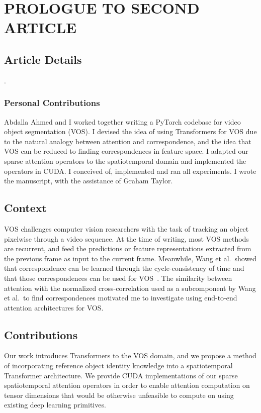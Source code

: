 \chapter{PROLOGUE TO SECOND ARTICLE}


\section{Article Details}

.

\subsection{Personal Contributions}

Abdalla Ahmed and I worked together writing a PyTorch codebase for video object
segmentation (VOS).
I devised the idea of using Transformers for VOS due to the natural analogy
between attention and correspondence, and the idea that VOS can be reduced to
finding correspondences in feature space.
I adapted our sparse attention operators to the spatiotemporal domain and
implemented the operators in CUDA.
I conceived of, implemented and ran all experiments.
I wrote the manuscript, with the assistance of Graham Taylor.


\section{Context}

VOS challenges computer vision researchers with the task of tracking an object
pixelwise through a video sequence.
At the time of writing, most VOS methods are recurrent, and feed the
predictions or feature representations extracted from the previous frame as
input to the current frame.
Meanwhile, Wang et al.\ showed that correspondence can be learned through the
cycle-consistency of time and that those correspondences can be used for
VOS~\citep{wang2019learning}.
The similarity between attention with the normalized cross-correlation used as
a subcomponent by Wang et al.\ to find correspondences motivated me to
investigate using end-to-end attention architectures for VOS\@.


\section{Contributions}

Our work introduces Transformers to the VOS domain, and we propose a method of
incorporating reference object identity knowledge into a spatiotemporal
Transformer architecture.
We provide CUDA implementations of our sparse spatiotemporal attention
operators in order to enable attention computation on tensor dimensions that
would be otherwise unfeasible to compute on using existing deep learning
primitives.
